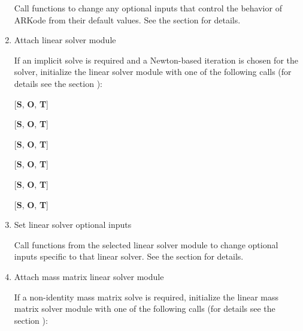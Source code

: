 \documentclass[letterpaper,10pt,english]{sphinxmanual}
\begin{document}
\begin{enumerate}
Call  functions to change any optional inputs that
control the behavior of ARKode from their default values. See
the section {\hyperref[c_interface/User_callable:cinterface-optionalinputs]{\emph{}}} for details.

\item {} 
Attach linear solver module

If an implicit solve is required and a Newton-based iteration is
chosen for the solver, initialize the linear solver module with one
of the following calls (for details see the section
{\hyperref[c_interface/User_callable:cinterface-linearsolvers]{\emph{}}}):

{[}\textbf{S}, \textbf{O}, \textbf{T}{]} 

{[}\textbf{S}, \textbf{O}, \textbf{T}{]} 

{[}\textbf{S}, \textbf{O}, \textbf{T}{]} 

{[}\textbf{S}, \textbf{O}, \textbf{T}{]} 

{[}\textbf{S}, \textbf{O}, \textbf{T}{]} 

{[}\textbf{S}, \textbf{O}, \textbf{T}{]} 






\item {} 
Set linear solver optional inputs

Call  functions from the selected linear solver module to
change optional inputs specific to that linear solver. See the section
{\hyperref[c_interface/User_callable:cinterface-optionalinputs]{\emph{}}} for details.

\item {} 
Attach mass matrix linear solver module

If a non-identity mass matrix solve is required, initialize the
linear mass matrix solver module with one of the following calls
(for details see the section {\hyperref[c_interface/User_callable:cinterface-linearsolvers]{\emph{}}}):


\end{enumerate}
\end{document}
